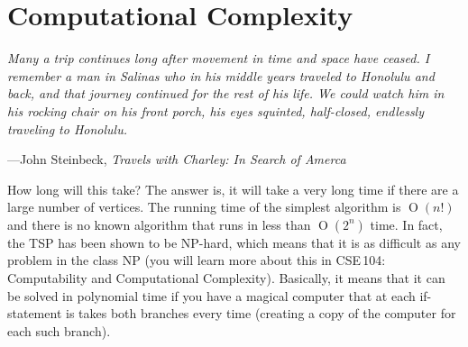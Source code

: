 \section{Computational Complexity}

\textwidth \epigraph{\emph{Many a trip continues long
    after movement in time and space have ceased. I remember a man in
    Salinas who in his middle years traveled to Honolulu and back, and
    that journey continued for the rest of his life. We could watch him
    in his rocking chair on his front porch, his eyes squinted,
    half-closed, endlessly traveling to Honolulu.}}{---John Steinbeck,
    \emph{Travels with Charley: In Search of Amerca}}

\noindent
How long will this take?
The answer is, it will take a very long time if there are a large number
of vertices. The running time of the simplest algorithm is
$\operatorname{O}(n!)$ and there is no known algorithm that runs in less
than $\operatorname{O}(2^n)$ time.  In fact, the TSP has been shown to
be NP-hard, which means that it is as difficult as any problem in the
class NP (you will learn more about this in CSE\,104: Computability and
Computational Complexity).  Basically, it means that it can be solved in
polynomial time if you have a magical computer that at each if-statement
is takes both branches every time (creating a copy of the computer for
each such branch).
